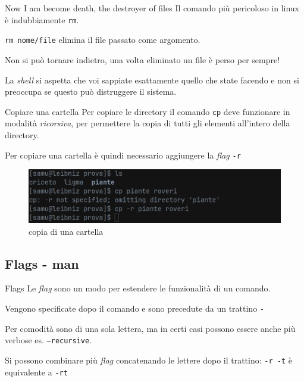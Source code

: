 \documentclass{beamer}
\begin{document}
\begin{frame}{Now I am become death, the destroyer of files}
  Il comando più pericoloso in linux è indubbiamente \texttt{rm}.\bigskip

  \texttt{rm nome/file} elimina il file passato come argomento.\bigskip

  Non si può tornare indietro, una volta eliminato un file è perso per 
  sempre!\bigskip

  La \textit{shell} si aspetta che voi sappiate esattamente quello che state 
  facendo e non si preoccupa se questo può distruggere il sistema.
\end{frame}

\begin{frame}{Copiare una cartella}
  Per copiare le directory il comando \texttt{cp} deve funzionare in modalità 
  \textit{ricorsiva}, per permettere la copia di tutti gli elementi all'intero
  della directory.\bigskip

  Per copiare una cartella è quindi necessario aggiungere la \textit{flag} 
  \texttt{-r}
  \begin{figure}
    \includegraphics[width=\textwidth]{assets/command-cp-dir.png}
    \caption{copia di una cartella}
  \end{figure}
\end{frame}

\subsection{Flags - man}
\begin{frame}{Flags}
  Le \textit{flag} sono un modo per estendere le funzionalità di un 
  comando.\bigskip

  Vengono specificate dopo il comando e sono precedute da un trattino 
  \texttt{-}\bigskip

  Per comodità sono di una sola lettera, ma in certi casi possono essere anche 
  più verbose es. \texttt{--recursive}.\bigskip

  Si possono combinare più \textit{flag} concatenando le lettere dopo il 
  trattino: \texttt{-r -t} è equivalente a \texttt{-rt}
\end{frame}
\end{document}
